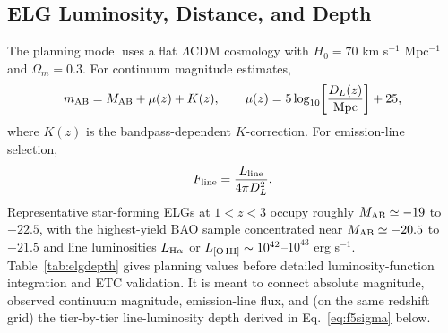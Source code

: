 \documentclass[10pt,onecolumn]{article}
\begin{document}
\subsection{ELG Luminosity, Distance, and Depth}\label{sec:elgdepth}

The planning model uses a flat $\Lambda$CDM cosmology with $H_0=70$ km s$^{-1}$ Mpc$^{-1}$ and $\Omega_m=0.3$. For continuum magnitude estimates,
\begin{equation}
  m_{\rm AB}=M_{\rm AB}+\mu(z)+K(z), \qquad
  \mu(z)=5\log_{10}\!\left[\frac{D_L(z)}{\rm Mpc}\right]+25,
\end{equation}
where $K(z)$ is the bandpass-dependent $K$-correction. For emission-line selection,
\begin{equation}
  F_{\rm line}=\frac{L_{\rm line}}{4\pi D_L^2}.
\end{equation}
Representative star-forming ELGs at $1<z<3$ occupy roughly $M_{\rm AB}\simeq-19$ to $-22.5$, with the highest-yield BAO sample concentrated near $M_{\rm AB}\simeq-20.5$ to $-21.5$ and line luminosities $L_{\rm H\alpha}$ or $L_{\rm [O\,III]}\sim10^{42}$--$10^{43}$ erg s$^{-1}$. Table~\ref{tab:elgdepth} gives planning values before detailed luminosity-function integration and ETC validation. It is meant to connect absolute magnitude, observed continuum magnitude, emission-line flux, and (on the same redshift grid) the tier-by-tier line-luminosity depth derived in Eq.~\eqref{eq:f5sigma} below.
\end{document}
